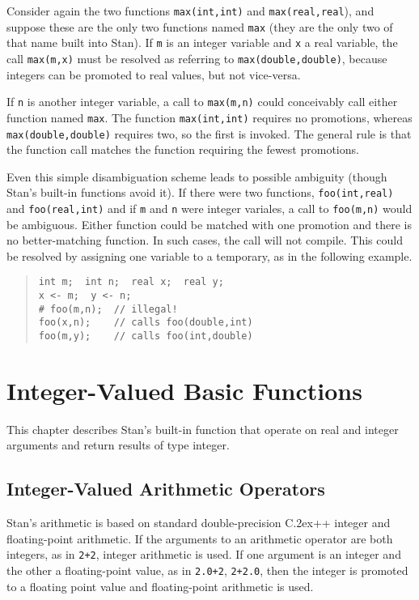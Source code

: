 \documentclass[10pt]{report}
\newcommand{\Stan}{Stan\xspace}
\newcommand*{\Cpp}{C\raise.2ex\hbox{\footnotesize ++}\xspace} %
\newcommand{\code}[1]{{\tt #1}}
\begin{document}
Consider again the two functions \code{max(int,int)} and
\code{max(real,real}), and suppose these are the only two functions
named \code{max} (they are the only two of that name built into
\Stan).  If \code{m} is an integer variable and \code{x} a real
variable, the call \code{max(m,x)} must be resolved as referring to
\code{max(double,double)}, because integers can be promoted to real
values, but not vice-versa.  

If \code{n} is another integer variable, a call to \code{max(m,n)}
could conceivably call either function named \code{max}.  The function
\code{max(int,int)} requires no promotions, whereas
\code{max(double,double)} requires two, so the first is invoked.  The
general rule is that the function call matches the function requiring
the fewest promotions.

Even this simple disambiguation scheme leads to possible ambiguity
(though \Stan's built-in functions avoid it).  If there were two functions,
\code{foo(int,real)} and \code{foo(real,int)} and if \code{m} and
\code{n} were integer variales, a call to \code{foo(m,n)} would be
ambiguous.  Either function could be matched with one promotion and
there is no better-matching function.  In such cases, the call will
not compile.  This could be resolved by assigning one variable to a
temporary, as in the following example.
%
\begin{quote}
\begin{Verbatim}
int m;  int n;  real x;  real y;  
x <- m;  y <- n;
# foo(m,n);  // illegal!
foo(x,n);    // calls foo(double,int)
foo(m,y);    // calls foo(int,double)
\end{Verbatim}
\end{quote}





\chapter{Integer-Valued Basic Functions}

This chapter describes \Stan's built-in function that operate on real
and integer arguments and return results of type integer.


\section{Integer-Valued Arithmetic Operators}

\Stan's arithmetic is based on standard double-precision \Cpp integer and
floating-point arithmetic.  If the arguments to an arithmetic operator
are both integers, as in \code{2+2}, integer arithmetic is used.  If
one argument is an integer and the other a floating-point value, as in
\code{2.0+2}, \code{2+2.0}, then the integer is promoted to a floating
point value and floating-point arithmetic is used.
\end{document}
